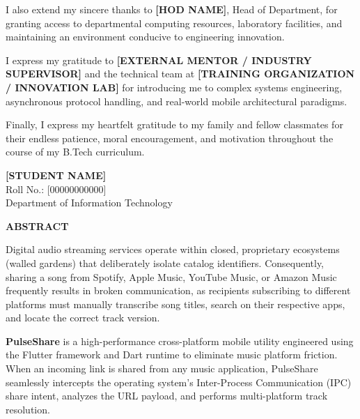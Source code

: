 \documentclass[12pt,a4paper]{report}
\newcommand{\studentName}{[STUDENT NAME]}
\newcommand{\studentRoll}{[00000000000]}
\newcommand{\departmentName}{Department of Information Technology}
\newcommand{\hodName}{[HOD NAME]}
\newcommand{\hodDesignation}{Head of Department}
\newcommand{\companyName}{[TRAINING ORGANIZATION / INNOVATION LAB]}
\newcommand{\mentorName}{[EXTERNAL MENTOR / INDUSTRY SUPERVISOR]}
\begin{document}
\vspace{0.5cm}
\noindent I also extend my sincere thanks to \textbf{\hodName}, \hodDesignation, for granting access to departmental computing resources, laboratory facilities, and maintaining an environment conducive to engineering innovation.

\vspace{0.5cm}
\noindent I express my gratitude to \textbf{\mentorName} and the technical team at \textbf{\companyName} for introducing me to complex systems engineering, asynchronous protocol handling, and real-world mobile architectural paradigms. 

\vspace{0.5cm}
\noindent Finally, I express my heartfelt gratitude to my family and fellow classmates for their endless patience, moral encouragement, and motivation throughout the course of my B.Tech curriculum.

\vspace{2.5cm}
\begin{flushright}
    \textbf{\studentName}\\
    Roll No.: \studentRoll\\
    \departmentName
\end{flushright}
\clearpage

\newpage
\begin{center}
    {\fontsize{16}{20}\selectfont \textbf{ABSTRACT}}
\end{center}
\vspace{0.8cm}

\noindent Digital audio streaming services operate within closed, proprietary ecosystems (walled gardens) that deliberately isolate catalog identifiers. Consequently, sharing a song from Spotify, Apple Music, YouTube Music, or Amazon Music frequently results in broken communication, as recipients subscribing to different platforms must manually transcribe song titles, search on their respective apps, and locate the correct track version.

\vspace{0.4cm}
\noindent \textbf{PulseShare} is a high-performance cross-platform mobile utility engineered using the Flutter framework and Dart runtime to eliminate music platform friction. When an incoming link is shared from any music application, PulseShare seamlessly intercepts the operating system's Inter-Process Communication (IPC) share intent, analyzes the URL payload, and performs multi-platform track resolution.
\end{document}
